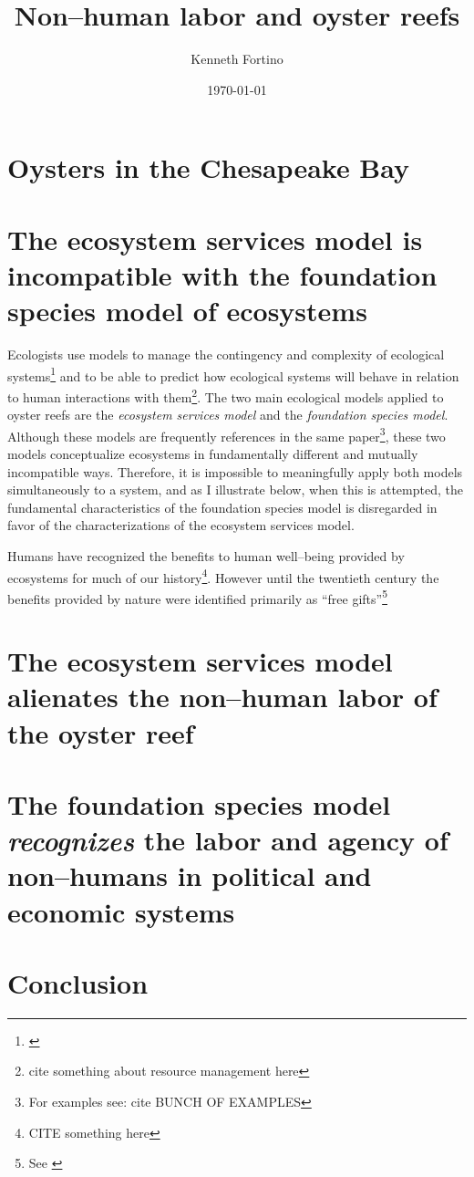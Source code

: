\documentclass{article}
\begin{document}
\title{Non--human labor and oyster reefs}
\author{Kenneth Fortino}
\date{\today}

\maketitle

\section{Oysters in the Chesapeake Bay}

\section{The ecosystem services model is incompatible with the foundation species model of ecosystems}

Ecologists use models to manage the contingency and complexity of ecological systems\footnote{\cite{lawton_laws_1999}} and to be able to predict how ecological systems will behave in relation to human interactions with them\footnote{cite something about resource management here}. The two main ecological models applied to oyster reefs are the \emph{ecosystem services model} and the \emph{foundation species model}. Although these models are frequently references in the same paper\footnote{For examples see: cite BUNCH OF EXAMPLES}, these two models conceptualize ecosystems in fundamentally different and mutually incompatible ways. Therefore, it is impossible to meaningfully apply both models simultaneously to a system, and as I illustrate below, when this is attempted, the fundamental characteristics of the foundation species model is disregarded in favor of the characterizations of the ecosystem services model.

Humans have recognized the benefits to human well--being provided by ecosystems for much of our history\footnote{CITE something here}. However until the twentieth century the benefits provided by nature were identified primarily as ``free gifts''\footnote{See \cite{battistoni_bringing_2017}}

\section{The ecosystem services model alienates the non--human labor of the oyster reef}

\section{The foundation species model \emph{recognizes} the labor and agency of non--humans in political and economic systems}

\section{Conclusion}




\end{document}

